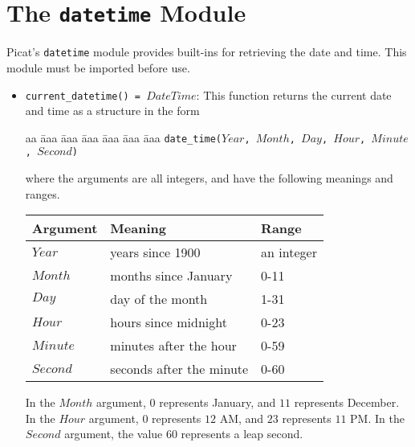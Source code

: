 
\chapter{\label{chapter:datetime}The \texttt{datetime} Module}

Picat's \texttt{datetime} module provides built-ins for retrieving the date and time. This module must be imported before use.

\begin{itemize}
\item \texttt{current\_datetime() = $DateTime$}: This function returns the current date and time as a structure in the form 
\begin{tabbing}
aa \= aaa \= aaa \= aaa \= aaa \= aaa \= aaa \kill
\> \texttt{date\_time($Year$, $Month$, $Day$, $Hour$, $Minute$, $Second$)}
\end{tabbing}
where the arguments are all integers, and have the following meanings and ranges.

\begin{center}
\begin{tabular}{|l|l|l||}
\hline
\textbf{Argument} & \textbf{Meaning} & \textbf{Range} \\
\hline 
\hline 
$Year$ & years since 1900 & an integer \\
$Month$ & months since January & 0-11 \\
$Day$ & day of the month & 1-31 \\
$Hour$ & hours since midnight & 0-23 \\
$Minute$ & minutes after the hour & 0-59 \\
$Second$ & seconds after the minute & 0-60 \\
\hline
\end{tabular}
\end{center}

\noindent
In the $Month$ argument, $0$ represents January, and $11$ represents December.  In the $Hour$ argument, $0$ represents $12$ AM, and $23$ represents $11$ PM.  In the $Second$ argument, the value $60$ represents a leap second.


\end{itemize}

